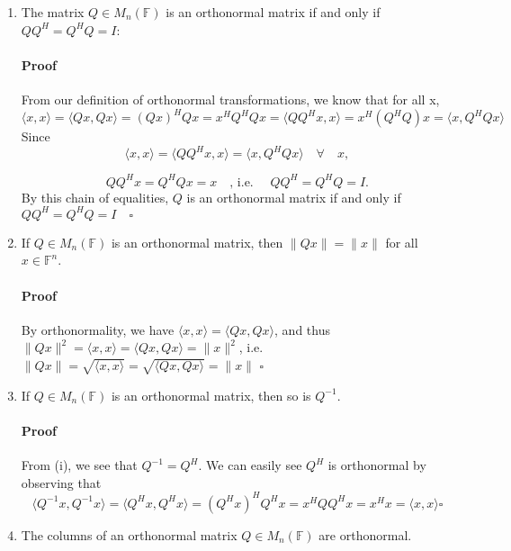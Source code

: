 \documentclass[letterpaper,12pt]{article}
\theoremstyle{definition}
\begin{document}
\begin{enumerate}[label=(\roman*)]

\item The matrix $Q \in M_n(\mathds{F})$ is an orthonormal matrix if and only if $QQ^H = Q^HQ = I $:

\paragraph{Proof} From our definition of orthonormal transformations, we know that for all x,
$$ \langle x, x \rangle = \langle Qx, Qx \rangle = (Qx)^HQx = x^HQ^HQx = \langle QQ^Hx, x \rangle = x^H(Q^HQ)x =  \langle x, Q^HQx \rangle $$
Since $$\langle x, x \rangle = \langle QQ^Hx, x \rangle =  \langle x, Q^HQx \rangle \quad \forall \quad x,$$ 

$$ QQ^Hx = Q^HQx = x \quad \text{, i.e. } \quad QQ^H = Q^HQ = I .$$
By this chain of equalities, $Q$ is an orthonormal matrix if and only if $QQ^H = Q^HQ = I \quad \square$





\item If $Q \in M_n(\mathds{F})$ is an orthonormal matrix, then $\|Qx\| = \|x\|$ for all  $x \in \mathds{F}^n$.
\paragraph{Proof} By orthonormality, we have   $\langle x, x \rangle = \langle Qx, Qx \rangle $, and thus $\|Qx\|^2 = \langle x, x \rangle = \langle Qx, Qx \rangle = \|x\|^2$, i.e. $\|Qx\| = \sqrt{\langle x, x \rangle} = \sqrt{\langle Qx, Qx \rangle} = \|x\|$ $\square$

\item If $Q \in M_n(\mathds{F})$ is an orthonormal matrix, then so is $ Q^{-1}$.
\paragraph{Proof} From (i), we see that $ Q^{-1} = Q^H$. We can easily see $Q^H$ is orthonormal by observing that $$\langle Q^{-1}x,  Q^{-1}x \rangle = \langle Q^Hx,  Q^Hx \rangle = (Q^Hx)^HQ^Hx = x^HQQ^Hx = x^Hx = \langle x, x\rangle \square$$


\item The columns of an orthonormal matrix $Q \in M_n(\mathds{F})$ are orthonormal. 

\end{enumerate}
\end{document}
